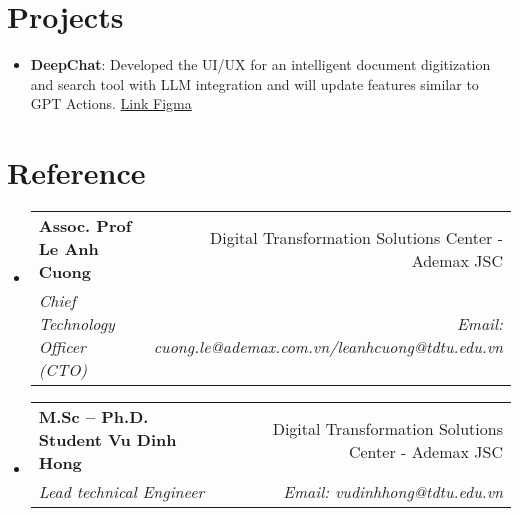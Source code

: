 \documentclass[letterpaper,11pt]{article}
\makeatletter
\newcommand{\resumeItem}[2]{
  \item\small{
    \textbf{#1}{: #2 \vspace{-2pt}}
  }
}
\newcommand{\resumeSubheading}[4]{
  \vspace{-1pt}\item
    \begin{tabular*}{0.97\textwidth}[t]{l@{\extracolsep{\fill}}r}
      \textbf{#1} & #2 \\
      \textit{\small#3} & \textit{\small #4} \\
    \end{tabular*}\vspace{-5pt}
}
\newcommand{\resumeSubItem}[2]{\resumeItem{#1}{#2}\vspace{-4pt}}
\newcommand{\resumeSubHeadingListStart}{\begin{itemize}[leftmargin=*]}
\newcommand{\resumeSubHeadingListEnd}{\end{itemize}}
\makeatother
\begin{document}
\section{Projects}
  \resumeSubHeadingListStart
    \resumeSubItem{DeepChat}
      {Developed the UI/UX for an intelligent document digitization and search tool with LLM integration and will update features similar to GPT Actions. \href{https://www.figma.com/design/I82AONJnuQOBZIUS6y41YZ/Ademax-Sora?node-id=36-9828&m=dev}{Link Figma}}
  \resumeSubHeadingListEnd

\section{Reference}
  \resumeSubHeadingListStart
    \resumeSubheading
      {Assoc. Prof Le Anh Cuong}{Digital Transformation Solutions Center - Ademax JSC}
      {Chief Technology Officer (CTO)}{Email: cuong.le@ademax.com.vn/leanhcuong@tdtu.edu.vn}

    \resumeSubheading
  {M.Sc – Ph.D. Student Vu Dinh Hong}{Digital Transformation Solutions Center - Ademax JSC}
  {Lead technical Engineer}{Email: vudinhhong@tdtu.edu.vn}
  \resumeSubHeadingListEnd
\end{document}
